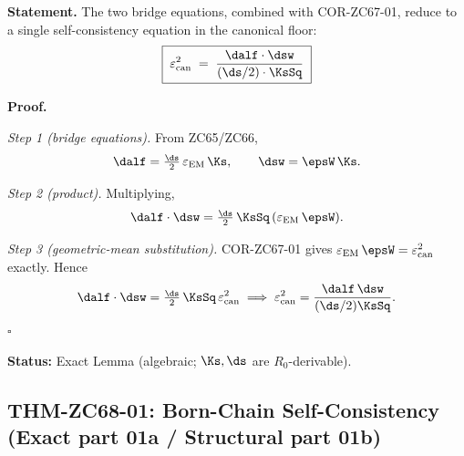 \documentclass[12pt, a4paper]{article}
\renewcommand{\epsEM}{\varepsilon_{\rm EM}}
\renewcommand{\epscan}{\varepsilon_{\rm can}}
\begin{document}
\begin{formalbox}[title={LEM-ZC68-01: Fixed-Point Reduction
  ($R_0$, Exact)}]

\textbf{Statement.}
The two bridge equations, combined with COR-ZC67-01, reduce to a
single self-consistency equation in the canonical floor:
\begin{equation}
  \boxed{\;
    \epscan^{2}
    \;=\;
    \frac{\dalf\cdot\dsw}{(\ds/2)\cdot\KsSq}
  \;}
  \label{eq:fixedpoint}
\end{equation}

\textbf{Proof.}

\textit{Step 1 (bridge equations).}
From ZC65/ZC66,
\[
  \dalf = \tfrac{\ds}{2}\,\epsEM\,\Ks,
  \qquad
  \dsw  = \epsW\,\Ks.
\]

\textit{Step 2 (product).}
Multiplying,
\[
  \dalf\cdot\dsw
  = \tfrac{\ds}{2}\,\KsSq\,(\epsEM\,\epsW).
\]

\textit{Step 3 (geometric-mean substitution).}
COR-ZC67-01 gives $\epsEM\,\epsW=\epscan^{2}$ exactly. Hence
\[
  \dalf\cdot\dsw = \tfrac{\ds}{2}\,\KsSq\,\epscan^{2}
  \;\Longrightarrow\;
  \epscan^{2}=\frac{\dalf\,\dsw}{(\ds/2)\KsSq}.
\]
\hfill$\square$

\textbf{Status:} Exact Lemma (algebraic; $\Ks,\ds$ are $R_0$-derivable).
\end{formalbox}

\subsection{THM-ZC68-01: Born-Chain Self-Consistency
  (Exact part 01a / Structural part 01b)}
\label{sec:thm}

\end{document}
